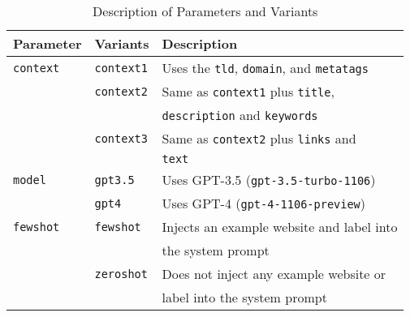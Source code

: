 \begin{table}[htbp]
    \centering
    \begin{tabular}{lll}
        \toprule
        \textbf{Parameter} & \textbf{Variants} & \textbf{Description} \\
        \midrule
        \texttt{context} 
            & \texttt{context1} & Uses the \texttt{tld}, \texttt{domain}, and \texttt{metatags} \\
            
            & \texttt{context2} & Same as \texttt{context1} plus \texttt{title}, \\ & & \texttt{description} and \texttt{keywords} \\
            
            & \texttt{context3} & Same as \texttt{context2} plus \texttt{links} and \\ & & \texttt{text}\\

        \addlinespace
        \texttt{model} 
            & \texttt{gpt3.5} & Uses GPT-3.5 (\texttt{gpt-3.5-turbo-1106}) \\
            
            & \texttt{gpt4}   & Uses GPT-4 (\texttt{gpt-4-1106-preview}) \\
        
        \addlinespace
        \texttt{fewshot} 
            & \texttt{fewshot} & Injects an example website and label into \\ & & the system prompt \\
            
            & \texttt{zeroshot} & Does not inject any example website or \\ & & label into  the system prompt \\
        \bottomrule
    \end{tabular}
    \caption{Description of Parameters and Variants}
    \label{tab:parameters}
\end{table}
